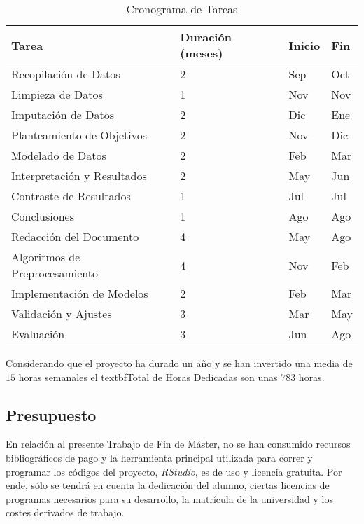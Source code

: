 \begin{table}[H]
    \label{tab:gantt}
    \centering
    \renewcommand{\arraystretch}{1.2} %
    \begin{tabular}{p{4cm} p{2.5cm} p{2.5cm} p{2.5cm}}
    \toprule
    \textbf{Tarea} & \textbf{Duración (meses)} & \textbf{Inicio} & \textbf{Fin} \\
    \midrule
    Recopilación de Datos          & 2 & Sep & Oct \\
    Limpieza de Datos              & 1 & Nov & Nov \\
    Imputación de Datos            & 2 & Dic & Ene \\
    Planteamiento de Objetivos     & 2 & Nov & Dic \\
    Modelado de Datos              & 2 & Feb & Mar \\
    Interpretación y Resultados    & 2 & May & Jun \\
    Contraste de Resultados        & 1 & Jul & Jul \\
    Conclusiones                   & 1 & Ago & Ago \\
    Redacción del Documento        & 4 & May & Ago \\
    Algoritmos de Preprocesamiento & 4 & Nov & Feb \\
    Implementación de Modelos      & 2 & Feb & Mar \\
    Validación y Ajustes           & 3 & Mar & May \\
    Evaluación                     & 3 & Jun & Ago \\
    \bottomrule
    \end{tabular}
    \caption{Cronograma de Tareas}
    \end{table}

Considerando que el proyecto ha durado un año y se han invertido una media de $15$ horas semanales el textbf{Total de Horas Dedicadas} son unas $783$ horas. 



\subsection{Presupuesto}\label{sec:presupuesto}

En relación al presente Trabajo de Fin de Máster, no se han consumido recursos bibliográficos de pago y la herramienta principal utilizada para correr y programar los códigos del proyecto, \textit{RStudio}, es de uso y licencia gratuita. Por ende, sólo se tendrá en cuenta la dedicación del alumno, ciertas licencias de programas necesarios para su desarrollo, la matrícula de la universidad y los costes derivados de trabajo.

